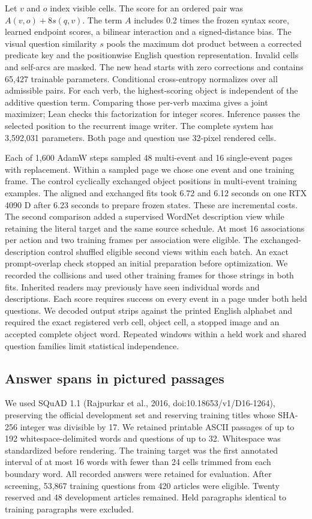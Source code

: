 \documentclass[12pt,a4paper]{article}
\providecommand{\DIFadd}[1]{{\protect\color{blue} \sf #1}} %
\begin{document}
\DIFadd{Let $v$ and $o$ index visible cells. The score for an ordered pair was $A(v,o)+8s(q,v)$. The term $A$ includes 0.2 times the frozen syntax score, learned endpoint scores, a bilinear interaction and a signed-distance bias. The visual question similarity $s$ pools the maximum dot product between a corrected predicate key and the positionwise English question representation. Invalid cells and self-arcs are masked. The new head starts with zero corrections and contains 65,427 trainable parameters. Conditional cross-entropy normalizes over all admissible pairs. For each verb, the highest-scoring object is independent of the additive question term. Comparing those per-verb maxima gives a joint maximizer; Lean checks this factorization for integer scores. Inference passes the selected position to the recurrent image writer. The complete system has 3,592,031 parameters. Both page and question use 32-pixel rendered cells.
}

\DIFadd{Each of 1,600 AdamW steps sampled 48 multi-event and 16 single-event pages with replacement. Within a sampled page we chose one event and one training frame. The control cyclically exchanged object positions in multi-event training examples. The aligned and exchanged fits took 6.72 and 6.12 seconds on one RTX 4090 D after 6.23 seconds to prepare frozen states. These are incremental costs. The second comparison added a supervised WordNet description view while retaining the literal target and the same source schedule. At most 16 associations per action and two training frames per association were eligible. The exchanged-description control shuffled eligible second views within each batch. An exact prompt-overlap check stopped an initial preparation before optimization. We recorded the collisions and used other training frames for those strings in both fits. Inherited readers may previously have seen individual words and descriptions. Each score requires success on every event in a page under both held questions. We decoded output strips against the printed English alphabet and required the exact registered verb cell, object cell, a stopped image and an accepted complete object word. Repeated windows within a held work and shared question families limit statistical independence.
}

\subsection*{\DIFadd{Answer spans in pictured passages}}
\DIFadd{We used SQuAD 1.1 (Rajpurkar et al., 2016, doi:10.18653/v1/D16-1264), preserving the official development set and reserving training titles whose SHA-256 integer was divisible by 17. We retained printable ASCII passages of up to 192 whitespace-delimited words and questions of up to 32. Whitespace was standardized before rendering. The training target was the first annotated interval of at most 16 words with fewer than 24 cells trimmed from each boundary word. All recorded answers were retained for evaluation. After screening, 53,867 training questions from 420 articles were eligible. Twenty reserved and 48 development articles remained. Held paragraphs identical to training paragraphs were excluded.
}
\end{document}
